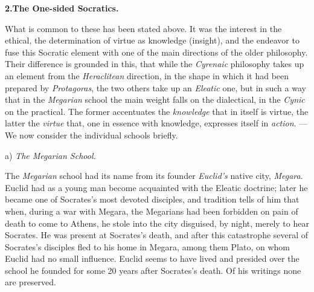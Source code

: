 \divrule

\begin{center}
\textbf{2.\enspace The One-sided Socratics.}
\end{center}

What is common to these has been stated above. It was the interest in the ethical, the determination of virtue as knowledge (insight), and the endeavor to fuse this Socratic element with one of the main directions of the older philosophy. Their difference is grounded in this, that while the \emph{Cyrenaic} philosophy takes up an element from the \emph{Heraclitean} direction, in the shape in which it had been prepared by \emph{Protagoras}, the two others take up an \emph{Eleatic} one, but in such a way that in the \emph{Megarian} school the main weight falls on the dialectical, in the \emph{Cynic} on the practical. The former accentuates the \emph{knowledge} that in itself is virtue, the latter the \emph{virtue} that, one in essence with knowledge, expresses itself in \emph{action}. --- We now consider the individual schools briefly.

\begin{center}
a) \emph{The Megarian School.}
\end{center}

The \emph{Megarian} school had its name from its founder \emph{Euclid's} native city, \emph{Megara}. Euclid had as a young man become acquainted with the Eleatic doctrine; later he became one of Socrates's most devoted disciples, and tradition tells of him that when, during a war with Megara, the Megarians had been forbidden on pain of death to come to Athens, he stole into the city disguised, by night, merely to hear Socrates. He was present at Socrates's death, and after this catastrophe several of Socrates's disciples fled to his home in Megara, among them Plato, on whom Euclid had no small influence. Euclid seems to have lived and presided over the school he founded for some 20 years after Socrates's death. Of his writings none are preserved.


